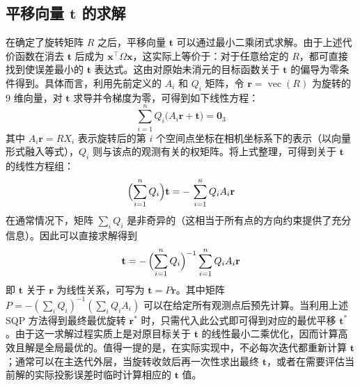 \subsection{平移向量 $\mathbf{t}$ 的求解}
在确定了旋转矩阵 $R$ 之后，平移向量 $\mathbf{t}$ 可以通过最小二乘闭式求解。由于上述代价函数在消去 $\mathbf{t}$ 后成为 $\mathbf{x}^\top \Omega \mathbf{x}$，这实际上等价于：对于任意给定的 $R$，都可直接找到使误差最小的 $\mathbf{t}$ 表达式。这由对原始未消元的目标函数关于 $\mathbf{t}$ 的偏导为零条件得到。具体而言，利用先前定义的 $A_i$ 和 $Q_i$ 矩阵，令 $\mathbf{r}=\operatorname{vec}(R)$ 为旋转的 9 维向量，对 $\mathbf{t}$ 求导并令梯度为零，可得到如下线性方程：
\begin{equation}
	\sum_{i=1}^{n} Q_i\bigl(A_i \mathbf{r}+\mathbf{t}\bigr)=\mathbf{0}_3
\end{equation}
其中 $A_i\mathbf{r}=R X_i$ 表示旋转后的第 $i$ 个空间点坐标在相机坐标系下的表示（以向量形式融入等式），$Q_i$ 则与该点的观测有关的权矩阵。将上式整理，可得到关于 $\mathbf{t}$ 的线性方程组：
\begin{equation}
	\Bigl(\sum_{i=1}^{n} Q_i\Bigr)\mathbf{t}
	=-\,\sum_{i=1}^{n} Q_i A_i \mathbf{r}
\end{equation}
在通常情况下，矩阵 $\sum_i Q_i$ 是非奇异的（这相当于所有点的方向约束提供了充分信息）。因此可以直接求解得到
\begin{equation}
	\mathbf{t}
	=-\,\Bigl(\sum_{i=1}^{n} Q_i\Bigr)^{-1}
	\sum_{i=1}^{n} Q_i A_i \mathbf{r}
\end{equation}
即 $\mathbf{t}$ 关于 $\mathbf{r}$ 为线性关系，可写为 $\mathbf{t}=P\mathbf{r}$。其中矩阵 $P=-(\sum_i Q_i)^{-1}(\sum_i Q_i A_i)$ 可以在给定所有观测点后预先计算。当利用上述 SQP 方法得到最终最优旋转 $\mathbf{r}^{*}$ 时，只需代入此公式即可得到对应的最优平移 $\mathbf{t}^{*}$。由于这一求解过程实质上是对原目标关于 $\mathbf{t}$ 的线性最小二乘优化，因而计算高效且解是全局最优的。值得一提的是，在实际实现中，不必每次迭代都重新计算 $\mathbf{t}$；通常可以在主迭代外层，当旋转收敛后再一次性求出最终 $\mathbf{t}$，或者在需要评估当前解的实际投影误差时临时计算相应的 $\mathbf{t}$ 值。

